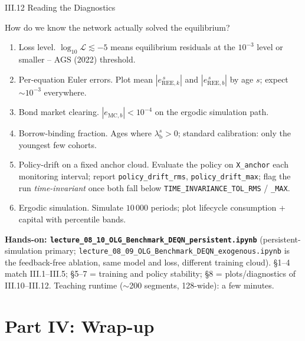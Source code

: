 \documentclass[aspectratio=169,11pt]{beamer}
\newcommand{\emphc}[1]{\textcolor{harvardcrimson}{#1}}
\newcommand{\Loss}{\mathcal{L}}
\begin{document}
\begin{frame}{III.12 Reading the Diagnostics}
\footnotesize
\begin{block}{How do we know the network actually solved the equilibrium?}
\vspace{-2pt}\begin{enumerate}\itemsep1pt
    \item \emphc{Loss level.}  $\log_{10}\Loss \lesssim -5$ means equilibrium residuals at the $10^{-3}$ level or smaller -- AGS (2022) threshold.
    \item \emphc{Per-equation Euler errors.}  Plot mean $|e_{\text{REE},k}^{\,s}|$ and $|e_{\text{REE},b}^{\,s}|$ by age $s$; expect $\sim 10^{-3}$ everywhere.
    \item \emphc{Bond market clearing.}  $|e_{\text{MC},b}| < 10^{-4}$ on the ergodic simulation path.
    \item \emphc{Borrow-binding fraction.}  Ages where $\lambda_{\text{b}}^s > 0$; standard calibration: only the youngest few cohorts.
    \item \emphc{Policy-drift on a fixed anchor cloud.}  Evaluate the policy on \texttt{X\_anchor} each monitoring interval; report \texttt{policy\_drift\_rms}, \texttt{policy\_drift\_max}; flag the run \emph{time-invariant} once both fall below \texttt{TIME\_INVARIANCE\_TOL\_RMS} / \texttt{\_MAX}.
    \item \emphc{Ergodic simulation.}  Simulate $10\,000$ periods; plot lifecycle consumption + capital with percentile bands.
\end{enumerate}
\end{block}

\vspace{-2pt}
\textbf{Hands-on: \texttt{lecture\_08\_10\_OLG\_Benchmark\_DEQN\_persistent.ipynb}} (persistent-simulation primary; \texttt{lecture\_08\_09\_OLG\_Benchmark\_DEQN\_exogenous.ipynb} is the feedback-free ablation, same model and loss, different training cloud).  \S 1--4 match III.1--III.5; \S 5--7 = training and policy stability; \S 8 = plots/diagnostics of III.10--III.12.  Teaching runtime ($\sim$200 segments, 128-wide): a few minutes.
\end{frame}



\section{Part IV: Wrap-up}
\end{document}
